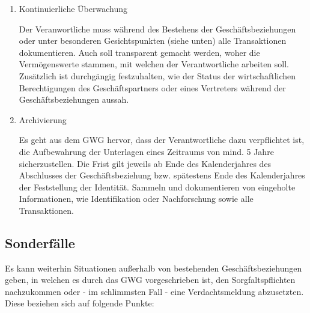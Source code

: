 \documentclass{article}
\begin{document}
        \begin{enumerate}

            \item Kontinuierliche Überwachung

                Der Veranwortliche muss während des Bestehens der Geschäftsbeziehungen oder unter besonderen Gesichtspunkten (siehe unten) alle Transaktionen dokumentieren. Auch soll transparent gemacht werden, woher die Vermögenswerte stammen, mit welchen der Verantwortliche arbeiten soll.
                Zusätzlich ist durchgängig festzuhalten, wie der Status der wirtschaftlichen Berechtigungen des Geschäftspartners oder eines Vertreters während der Geschäftsbeziehungen aussah.

            \item Archivierung

                Es geht aus dem GWG hervor, dass der Verantwortliche dazu verpflichtet ist, die Aufbewahrung der Unterlagen eines Zeitraums von mind. 5 Jahre sicherzustellen.
                Die Frist gilt jeweils ab Ende des Kalenderjahres des Abschlusses der Geschäftsbeziehung bzw. spätestens Ende des Kalenderjahres der Feststellung der Identität.
                Sammeln und dokumentieren von eingeholte Informationen, wie Identifikation oder Nachforschung sowie alle Transaktionen.

        \end{enumerate}  


        \subsection[Sonderfälle]{Sonderfälle}

        Es kann weiterhin Situationen außerhalb von bestehenden Geschäftsbeziehungen geben, in welchen es durch das GWG vorgeschrieben ist, den Sorgfaltspflichten nachzukommen oder - im schlimmsten Fall - eine Verdachtsmeldung abzusetzten. Diese beziehen sich auf folgende Punkte:
\end{document}
